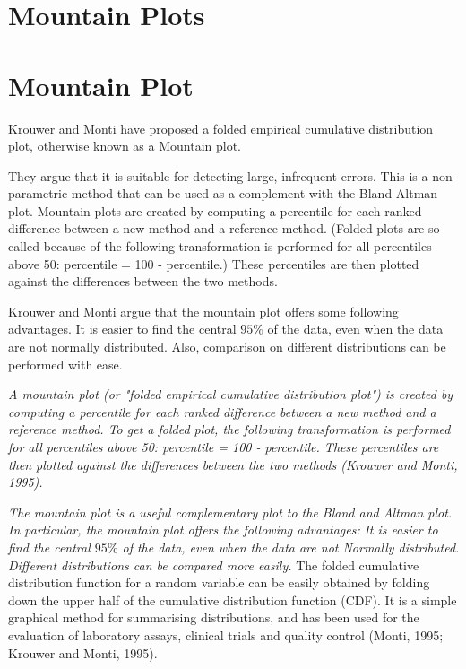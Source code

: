 \documentclass[Chap2bmain.tex]{subfiles}
\begin{document}
\section{Mountain Plots}
\section{Mountain Plot} Krouwer and Monti have proposed a folded empirical cumulative distribution plot, otherwise known as a Mountain plot.

They argue that it is suitable for detecting large, infrequent errors. This is a non-parametric method that can be used as a complement with the Bland Altman plot.  Mountain plots are created by computing a percentile
for each ranked difference between a new method and a reference method. (Folded plots are so called because of the following transformation is performed for all percentiles above 50: percentile = 100 - percentile.) These percentiles are then plotted against the differences between the two methods.

Krouwer and Monti argue that the mountain plot offers some following advantages. It is easier to find the central $95\%$ of the data, even when the data are not normally distributed. Also, comparison on different distributions can be performed with ease.

\emph{
A mountain plot (or "folded empirical cumulative distribution plot") is created by computing a percentile for each ranked difference between a new method and a reference method. To get a folded plot, the following transformation is performed for all percentiles above 50: percentile = 100 - percentile. These percentiles are then plotted against the differences between the two methods (Krouwer and Monti, 1995).}

\emph{
The mountain plot is a useful complementary plot to the Bland and Altman plot. In particular, the mountain plot offers the following advantages:}
\emph{
It is easier to find the central $95\%$ of the data, even when the data are not Normally distributed.
Different distributions can be compared more easily.
}
\newpage
The folded cumulative distribution function for a random variable can be easily obtained by folding down the upper half of the cumulative distribution
function (CDF). It is a simple graphical method for summarising distributions, and has been used for the evaluation of laboratory assays, clinical trials
and quality control (Monti, 1995; Krouwer and Monti, 1995).
\end{document}
